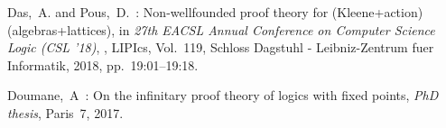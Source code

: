 \begin{thebibliography}{99}
  Das,~A. and Pous,~D.~: 
  Non-wellfounded proof theory for (Kleene+action)(algebras+lattices),
  in {\it 27th EACSL Annual Conference on Computer Science Logic (CSL '18)},
  ,
  LIPIcs,
  Vol.~119,
  Schloss Dagstuhl - Leibniz-Zentrum fuer Informatik,
  2018,
  pp.~19:01--19:18.
  
  Doumane,~A~: 
  On the infinitary proof theory of logics with fixed points,
  {\it PhD thesis}, Paris~7, 2017.

  

  









\end{thebibliography}
